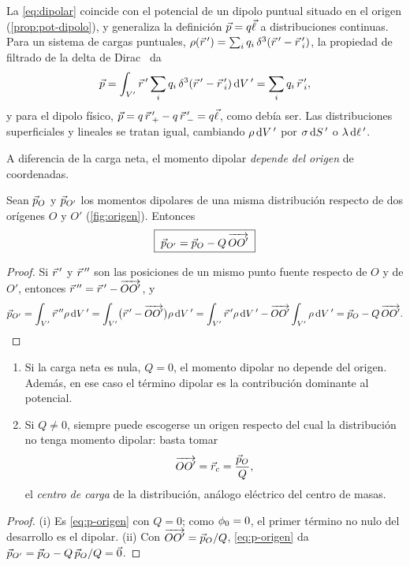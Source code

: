 \begin{observacion}\label{obs:p-general}
La \cref{eq:dipolar} coincide con el potencial de un dipolo puntual situado en el origen (\cref{prop:pot-dipolo}), y generaliza la definición $\vec{p}=q\vec{\ell}$ a
distribuciones continuas. Para un sistema de cargas puntuales, $\rho(\vec{r}\,')=\sum_iq_i\,\delta^{3}(\vec{r}\,'-\vec{r}\,'_i)$, la propiedad de filtrado de la delta de
Dirac~\cite{TEMA1} da
\begin{equation}\label{eq:p-discreto}
  \vec{p}=\int_{V'}\vec{r}\,'\sum_iq_i\,\delta^{3}(\vec{r}\,'-\vec{r}\,'_i)\,\mathrm{d} V\,'=\sum_{i}q_i\,\vec{r}\,'_i ,
\end{equation}
y para el dipolo físico, $\vec{p}=q\,\vec{r}\,'_{+}-q\,\vec{r}\,'_{-}=q\vec{\ell}$, como debía ser. Las distribuciones superficiales y lineales se tratan igual, cambiando
$\rho\,\mathrm{d} V\,'$ por $\sigma\,\mathrm{d} S\,'$ o $\lambda\,\mathrm{d} \ell\,'$.
\end{observacion}

A diferencia de la carga neta, el momento dipolar \emph{depende del origen} de coordenadas.



\begin{proposicion}\label{prop:p-origen}
Sean $\vec{p}_{O}$ y $\vec{p}_{O'}$ los momentos dipolares de una misma distribución respecto de dos orígenes $O$ y $O'$ (\cref{fig:origen}). Entonces
\begin{equation}\label{eq:p-origen}
  \boxed{\;\vec{p}_{O'}=\vec{p}_{O}-Q\,\overrightarrow{OO'}\;}
\end{equation}
\end{proposicion}
\begin{proof}
Si $\vec{r}\,'$ y $\vec{r}\,''$ son las posiciones de un mismo punto fuente respecto de $O$ y de $O'$, entonces $\vec{r}\,''=\vec{r}\,'-\overrightarrow{OO'}$, y
\[
  \vec{p}_{O'}=\int_{V'}\vec{r}\,''\rho\,\mathrm{d} V\,'=\int_{V'}\bigl(\vec{r}\,'-\overrightarrow{OO'}\bigr)\rho\,\mathrm{d} V\,'=\int_{V'}\vec{r}\,'\rho\,\mathrm{d} V\,'-\overrightarrow{OO'}\int_{V'}\rho\,\mathrm{d} V\,'=\vec{p}_{O}-Q\,\overrightarrow{OO'} .\qedhere
\]
\end{proof}

\begin{corolario}\label{cor:centro-carga}
\begin{enumerate}[label=(\roman*)]
  \item Si la carga neta es nula, $Q=0$, el momento dipolar no depende del origen. Además, en ese caso el término dipolar es la contribución dominante al potencial.
  \item Si $Q\neq0$, siempre puede escogerse un origen respecto del cual la distribución no tenga momento dipolar: basta tomar
        \begin{equation}\label{eq:centro-carga}
          \overrightarrow{OO'}=\vec{r}_{c}=\frac{\vec{p}_{O}}{Q},
        \end{equation}
        el \emph{centro de carga} de la distribución, análogo eléctrico del centro de masas.
\end{enumerate}
\end{corolario}
\begin{proof}
(i) Es \cref{eq:p-origen} con $Q=0$; como $\phi_{0}=0$, el primer término no nulo del desarrollo es el dipolar. (ii) Con $\overrightarrow{OO'}=\vec{p}_{O}/Q$,
\cref{eq:p-origen} da $\vec{p}_{O'}=\vec{p}_{O}-Q\,\vec{p}_{O}/Q=\vec{0}$.
\end{proof}

